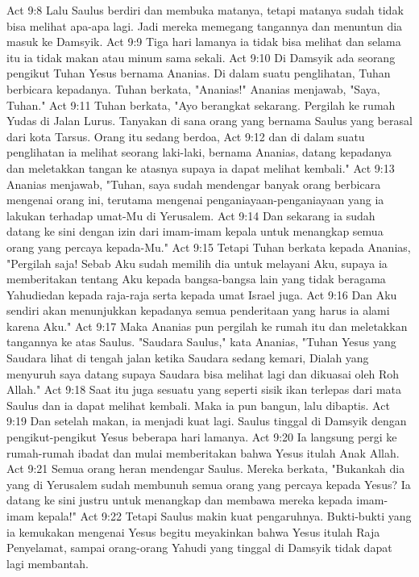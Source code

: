 Act 9:8  Lalu Saulus berdiri dan membuka matanya, tetapi matanya sudah tidak bisa melihat apa-apa lagi. Jadi mereka memegang tangannya dan menuntun dia masuk ke Damsyik.
Act 9:9  Tiga hari lamanya ia tidak bisa melihat dan selama itu ia tidak makan atau minum sama sekali.
Act 9:10  Di Damsyik ada seorang pengikut Tuhan Yesus bernama Ananias. Di dalam suatu penglihatan, Tuhan berbicara kepadanya. Tuhan berkata, "Ananias!" Ananias menjawab, "Saya, Tuhan."
Act 9:11  Tuhan berkata, "Ayo berangkat sekarang. Pergilah ke rumah Yudas di Jalan Lurus. Tanyakan di sana orang yang bernama Saulus yang berasal dari kota Tarsus. Orang itu sedang berdoa,
Act 9:12  dan di dalam suatu penglihatan ia melihat seorang laki-laki, bernama Ananias, datang kepadanya dan meletakkan tangan ke atasnya supaya ia dapat melihat kembali."
Act 9:13  Ananias menjawab, "Tuhan, saya sudah mendengar banyak orang berbicara mengenai orang ini, terutama mengenai penganiayaan-penganiayaan yang ia lakukan terhadap umat-Mu di Yerusalem.
Act 9:14  Dan sekarang ia sudah datang ke sini dengan izin dari imam-imam kepala untuk menangkap semua orang yang percaya kepada-Mu."
Act 9:15  Tetapi Tuhan berkata kepada Ananias, "Pergilah saja! Sebab Aku sudah memilih dia untuk melayani Aku, supaya ia memberitakan tentang Aku kepada bangsa-bangsa lain yang tidak beragama Yahudiedan kepada raja-raja serta kepada umat Israel juga.
Act 9:16  Dan Aku sendiri akan menunjukkan kepadanya semua penderitaan yang harus ia alami karena Aku."
Act 9:17  Maka Ananias pun pergilah ke rumah itu dan meletakkan tangannya ke atas Saulus. "Saudara Saulus," kata Ananias, "Tuhan Yesus yang Saudara lihat di tengah jalan ketika Saudara sedang kemari, Dialah yang menyuruh saya datang supaya Saudara bisa melihat lagi dan dikuasai oleh Roh Allah."
Act 9:18  Saat itu juga sesuatu yang seperti sisik ikan terlepas dari mata Saulus dan ia dapat melihat kembali. Maka ia pun bangun, lalu dibaptis.
Act 9:19  Dan setelah makan, ia menjadi kuat lagi. Saulus tinggal di Damsyik dengan pengikut-pengikut Yesus beberapa hari lamanya.
Act 9:20  Ia langsung pergi ke rumah-rumah ibadat dan mulai memberitakan bahwa Yesus itulah Anak Allah.
Act 9:21  Semua orang heran mendengar Saulus. Mereka berkata, "Bukankah dia yang di Yerusalem sudah membunuh semua orang yang percaya kepada Yesus? Ia datang ke sini justru untuk menangkap dan membawa mereka kepada imam-imam kepala!"
Act 9:22  Tetapi Saulus makin kuat pengaruhnya. Bukti-bukti yang ia kemukakan mengenai Yesus begitu meyakinkan bahwa Yesus itulah Raja Penyelamat, sampai orang-orang Yahudi yang tinggal di Damsyik tidak dapat lagi membantah.
